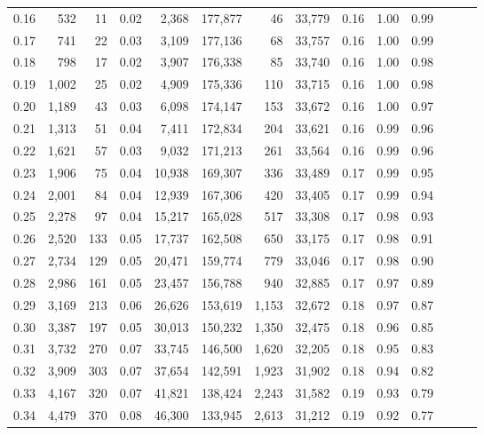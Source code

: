 \begin{tabular}{rrrrrrrrrrrrrr}
0.16 &    532 &   11 &  0.02 &    2,368 &  177,877 &      46 &  33,779 &  0.16 &  1.00 &      0.99 \\
0.17 &    741 &   22 &  0.03 &    3,109 &  177,136 &      68 &  33,757 &  0.16 &  1.00 &      0.99 \\
0.18 &    798 &   17 &  0.02 &    3,907 &  176,338 &      85 &  33,740 &  0.16 &  1.00 &      0.98 \\
0.19 &  1,002 &   25 &  0.02 &    4,909 &  175,336 &     110 &  33,715 &  0.16 &  1.00 &      0.98 \\
0.20 &  1,189 &   43 &  0.03 &    6,098 &  174,147 &     153 &  33,672 &  0.16 &  1.00 &      0.97 \\
0.21 &  1,313 &   51 &  0.04 &    7,411 &  172,834 &     204 &  33,621 &  0.16 &  0.99 &      0.96 \\
0.22 &  1,621 &   57 &  0.03 &    9,032 &  171,213 &     261 &  33,564 &  0.16 &  0.99 &      0.96 \\
0.23 &  1,906 &   75 &  0.04 &   10,938 &  169,307 &     336 &  33,489 &  0.17 &  0.99 &      0.95 \\
0.24 &  2,001 &   84 &  0.04 &   12,939 &  167,306 &     420 &  33,405 &  0.17 &  0.99 &      0.94 \\
0.25 &  2,278 &   97 &  0.04 &   15,217 &  165,028 &     517 &  33,308 &  0.17 &  0.98 &      0.93 \\
0.26 &  2,520 &  133 &  0.05 &   17,737 &  162,508 &     650 &  33,175 &  0.17 &  0.98 &      0.91 \\
0.27 &  2,734 &  129 &  0.05 &   20,471 &  159,774 &     779 &  33,046 &  0.17 &  0.98 &      0.90 \\
0.28 &  2,986 &  161 &  0.05 &   23,457 &  156,788 &     940 &  32,885 &  0.17 &  0.97 &      0.89 \\
0.29 &  3,169 &  213 &  0.06 &   26,626 &  153,619 &   1,153 &  32,672 &  0.18 &  0.97 &      0.87 \\
0.30 &  3,387 &  197 &  0.05 &   30,013 &  150,232 &   1,350 &  32,475 &  0.18 &  0.96 &      0.85 \\
0.31 &  3,732 &  270 &  0.07 &   33,745 &  146,500 &   1,620 &  32,205 &  0.18 &  0.95 &      0.83 \\
0.32 &  3,909 &  303 &  0.07 &   37,654 &  142,591 &   1,923 &  31,902 &  0.18 &  0.94 &      0.82 \\
0.33 &  4,167 &  320 &  0.07 &   41,821 &  138,424 &   2,243 &  31,582 &  0.19 &  0.93 &      0.79 \\
0.34 &  4,479 &  370 &  0.08 &   46,300 &  133,945 &   2,613 &  31,212 &  0.19 &  0.92 &      0.77 \\

\end{tabular}
